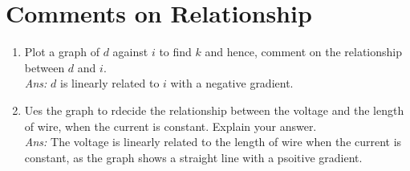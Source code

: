 \documentclass[oneside]{book}
\begin{document}
\section{Comments on Relationship}
\begin{enumerate}
    \item Plot a graph of \(d\) against \(i\) to find \(k\) and hence, comment on the relationship between \(d\) and \(i\).\\
    \emph{Ans:} \(d\) is linearly related to \(i\) with a negative gradient.
    \item Ues the graph to rdecide the relationship between the voltage and the length of wire, when the current is constant. Explain your answer.\\
    \emph{Ans:} The voltage is linearly related to the length of wire when the current is constant, as the graph shows a straight line with a psoitive gradient.
\end{enumerate}
\end{document}
